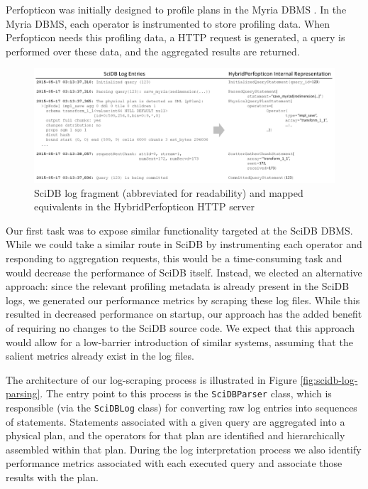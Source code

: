 \documentclass{chi2009}
\begin{document}
Perfopticon was initially designed to profile plans in the Myria DBMS \cite{perfopticon}.  In the Myria DBMS, each operator is instrumented to store profiling data.  When Perfopticon needs this profiling data, a HTTP request is generated, a query is performed over these data, and the aggregated results are returned.  
\begin{figure}
\centering
\includegraphics[width=\textwidth]{log-representation.png}
\caption{SciDB log fragment (abbreviated for readability) and mapped equivalents in the HybridPerfopticon HTTP server}
\label{fig:scidb-log-example}
\end{figure}

Our first task was to expose similar functionality targeted at the SciDB DBMS.  While we could take a similar route in SciDB by instrumenting each operator and responding to aggregation requests, this would be a time-consuming task and would decrease the performance of SciDB itself.  Instead, we elected an alternative approach: since the relevant profiling metadata is already present in the SciDB logs, we generated our performance metrics by scraping these log files.  While this resulted in decreased performance on startup\footnotemark, our approach has the added benefit of requiring no changes to the SciDB source code.  We expect that this approach would allow for a low-barrier introduction of similar systems, assuming that the salient metrics already exist in the log files.


The architecture of our log-scraping process is illustrated in Figure \ref{fig:scidb-log-parsing}.  The entry point to this process is the \texttt{SciDBParser} class, which is responsible (via the \texttt{SciDBLog} class) for converting raw log entries into sequences of statements.  Statements associated with a given query are aggregated into a physical plan, and the operators for that plan are identified and hierarchically assembled within that plan.  During the log interpretation process we also identify performance metrics associated with each executed query and associate those results with the plan.
\end{document}
